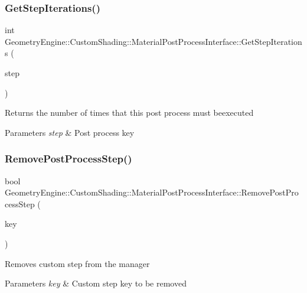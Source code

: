 \subsubsection{\texorpdfstring{GetStepIterations()}{GetStepIterations()}}
{\footnotesize\ttfamily int Geometry\+Engine\+::\+Custom\+Shading\+::\+Material\+Post\+Process\+Interface\+::\+Get\+Step\+Iterations (\begin{DoxyParamCaption}\item[{\mbox{\hyperlink{namespace_geometry_engine_1_1_custom_shading_af8b09b91ca7086f4f67a5d4181f35e58}{Material\+Post\+Process\+Steps}}}]{step }\end{DoxyParamCaption})}

Returns the number of times that this post process must beexecuted 
\begin{DoxyParams}{Parameters}
{\em step} & Post process key \\
\hline
\end{DoxyParams}
\mbox{\label{class_geometry_engine_1_1_custom_shading_1_1_material_post_process_interface_a8cf7682e78a9a2db70b1204e620e0623}} 
\subsubsection{\texorpdfstring{RemovePostProcessStep()}{RemovePostProcessStep()}}
{\footnotesize\ttfamily bool Geometry\+Engine\+::\+Custom\+Shading\+::\+Material\+Post\+Process\+Interface\+::\+Remove\+Post\+Process\+Step (\begin{DoxyParamCaption}\item[{\mbox{\hyperlink{namespace_geometry_engine_1_1_custom_shading_af8b09b91ca7086f4f67a5d4181f35e58}{Material\+Post\+Process\+Steps}}}]{key }\end{DoxyParamCaption})}

Removes custom step from the manager 
\begin{DoxyParams}{Parameters}
{\em key} & Custom step key to be removed \\
\hline
\end{DoxyParams}
\mbox{\label{class_geometry_engine_1_1_custom_shading_1_1_material_post_process_interface_a02fb160f9c92665cf2f644fbb65c5c71}} 
